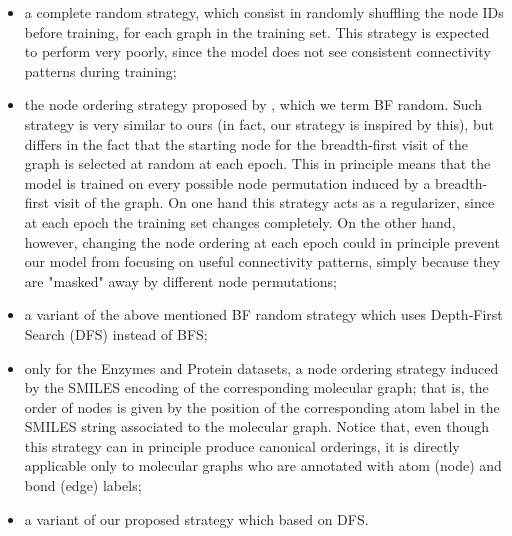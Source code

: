 \begin{itemize}
    \item a complete random strategy, which consist in randomly shuffling the node IDs before training, for each graph in the training set. This strategy is expected to perform very poorly, since the model does not see consistent connectivity patterns during training;
    \item the node ordering strategy proposed by \citet{you2018graphrnn}, which we term BF random. Such strategy is very similar to ours (in fact, our strategy is inspired by this), but differs in the fact that the starting node for the breadth-first visit of the graph is selected at random at each epoch. This in principle means that the model is trained on every possible node permutation induced by a breadth-first visit of the graph. On one hand this strategy acts as a regularizer, since at each epoch the training set changes completely. On the other hand, however, changing the node ordering at each epoch could in principle prevent our model from focusing on useful connectivity patterns, simply because they are "masked" away by different node permutations;
    \item a variant of the above mentioned BF random strategy which uses Depth-First Search (DFS) instead of BFS;
    \item only for the Enzymes and Protein datasets, a node ordering strategy induced by the SMILES encoding of the corresponding molecular graph; that is, the order of nodes is given by the position of the corresponding atom label in the SMILES string associated to the molecular graph. Notice that, even though this strategy can in principle produce canonical orderings, it is directly applicable only to molecular graphs who are annotated with atom (node) and bond (edge) labels;
    \item a variant of our proposed strategy which based on DFS.
\end{itemize}

